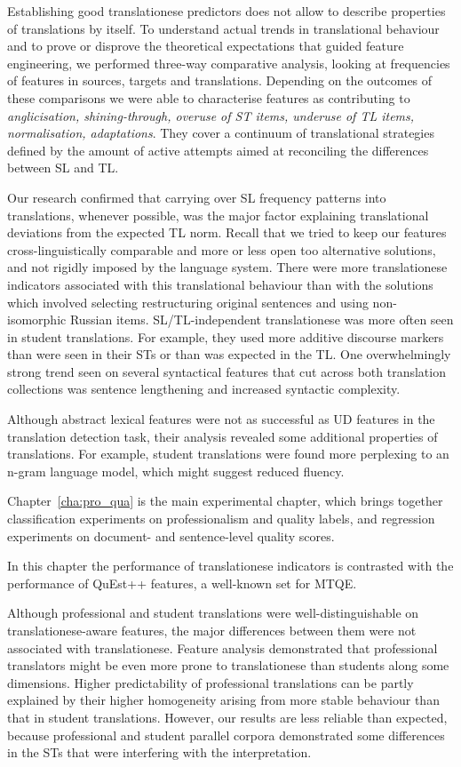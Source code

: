 Establishing good translationese predictors does not allow to describe properties of translations by itself. To understand actual trends in translational behaviour and to prove or disprove the theoretical expectations that guided feature engineering, we performed three-way comparative analysis, looking at frequencies of features in sources, targets and translations. 
Depending on the outcomes of these comparisons we were able to characterise features as contributing to \textit{anglicisation, shining-through, overuse of ST items, underuse of TL items, normalisation, adaptations}. They cover a continuum of translational strategies defined by the amount of active attempts aimed at reconciling the differences between SL and TL.

Our research confirmed that carrying over SL frequency patterns into translations, whenever possible, was the major factor explaining translational deviations from the expected TL norm. Recall that we tried to keep our features cross-linguistically comparable and more or less open too alternative solutions, and not rigidly imposed by the language system. There were more translationese indicators associated with this translational behaviour than with the solutions which involved selecting restructuring original sentences and using non-isomorphic Russian items. 
SL/TL-independent translationese was more often seen in student translations. For example, they used more additive discourse markers than were seen in their STs or than was expected in the TL. 
One overwhelmingly strong trend seen on several syntactical features that cut across both translation collections was sentence lengthening and increased syntactic complexity.

Although abstract lexical features were not as successful as UD features in the translation detection task, their analysis revealed some additional properties of translations. For example, student translations were found more perplexing to an n-gram language model, which might suggest reduced fluency. 

Chapter~\ref{cha:pro_qua} is the main experimental chapter, which brings together classification experiments on professionalism and quality labels, and regression experiments on document- and sentence-level quality scores. 

In this chapter the performance of translationese indicators is contrasted with the performance of QuEst++ features, a well-known set for MTQE. 

Although professional and student translations were well-distinguishable on translationese-aware features, the major differences between them were not associated with translationese. Feature analysis demonstrated that professional translators might be even more prone to translationese than students along some dimensions. Higher predictability of professional translations can be partly explained by their higher homogeneity arising from more stable behaviour than that in student translations.
However, our results are less reliable than expected, because professional and student parallel corpora demonstrated some differences in the STs that were interfering with the interpretation. 

